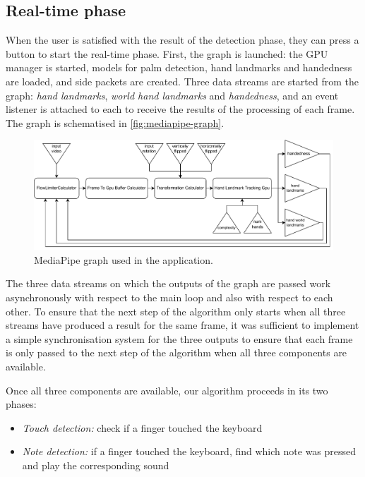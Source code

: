 \subsection{Real-time phase}\label{subsec:real-time-phase}
When the user is satisfied with the result of the detection phase, they can press a button to start the real-time phase.
First, the graph is launched: the GPU manager is started, models for palm detection,
hand landmarks and handedness are loaded, and side packets are created.
Three data streams are started from the graph: \textit{hand landmarks}, \textit{world hand landmarks} and
\textit{handedness}, and an event listener is attached to each to receive the results of the processing of each frame.
The graph is schematised in \autoref{fig:mediapipe-graph}.

\begin{figure}[ht]
	\centering
	\includegraphics[width=\textwidth]{images/application/mediapipe-gpu}
	\caption{MediaPipe graph used in the application.}
	\label{fig:mediapipe-graph}
\end{figure}

The three data streams on which the outputs of the graph are passed work asynchronously
with respect to the main loop and also with respect to each other.
To ensure that the next step of the algorithm only starts when all three streams have produced a result
for the same frame, it was sufficient to implement a simple synchronisation system for the three outputs
to ensure that each frame is only passed to the next step of the algorithm when all three components are available.

Once all three components are available, our algorithm proceeds in its two phases:
\begin{itemize}
	\item \textit{Touch detection:} check if a finger touched the keyboard
	\item \textit{Note detection:} if a finger touched the keyboard,
	find which note was pressed and play the corresponding sound
\end{itemize}

